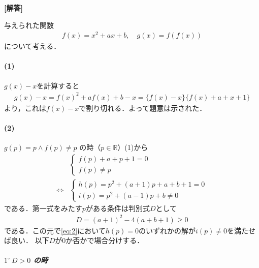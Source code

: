 \documentclass[../../main.tex]{subfiles}
\begin{document}
\begin{oframed}
  
\end{oframed}

{\bf [解答]}

与えられた関数
\begin{align}
  f(x) = x^2+ax+b, \quad
  g(x) = f(f(x)) \label{eq:1}
\end{align}
について考える．

\paragraph{(1)}

$g(x)-x$を計算すると
\begin{align}
  g(x)-x
  = f(x)^2+af(x)+b-x
  =\{f(x)-x\}\{f(x)+a+x+1\}
\end{align}
より，これは$f(x)-x$で割り切れる．よって題意は示された．

\paragraph{(2)}

$g(p)=p \land f(p) \neq p$ の時（$p \in \mathbb{R}$）(1)から
\begin{align}
  &
  \begin{cases}
    f(p)+a+p+1=0 \\
    f(p) \neq p
  \end{cases} \\
  \Leftrightarrow
  &
  \begin{cases}
    h(p) = p^2+(a+1)p+a+b+1=0  \\
    i(p) = p^2+(a-1)p+b \neq 0
  \end{cases} \label{eq:2}
\end{align}
である．第一式をみたす$p$がある条件は判別式$D$として
\begin{align}
  D = (a+1)^2-4(a+b+1) \ge 0 \label{eq:3}
\end{align}
である．この元で\cref{eq:2}において$h(p)=0$のいずれかの解が$i(p)\neq 0$を満たせば良い．
以下$D$が$0$か否かで場合分けする．

\subparagraph{$1^\circ \ D>0$ の時}
\end{document}
